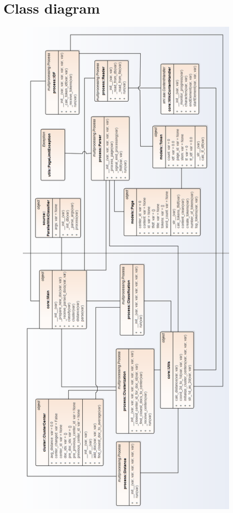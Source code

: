 \appendix
\chapter{Class diagram} \label{appendix-class}
\begin{figure}[h]
	\begin{center}
		\includegraphics[width=0.72\linewidth]{images/diagrams/class2h.png}
		\label{appendix-class-diagram}
	\end{center}
\end{figure}


